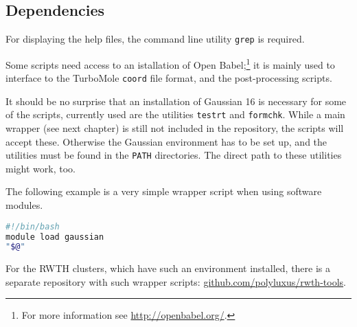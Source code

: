 \documentclass[   %
  final,          %
  a4paper         %
]{article}
\begin{document}
\subsection{Dependencies}

For displaying the help files, the command line utility \texttt{grep} is required.

Some scripts need access to an istallation of Open Babel;\footnote{%
  For more information see \href{http://openbabel.org/}{http://openbabel.org/}.}
it is mainly used to interface to the TurboMole \texttt{coord} file format,
and the post-processing scripts.

It should be no surprise that an installation of Gaussian 16 is necessary for
some of the scripts, currently used are the utilities \texttt{testrt} and \texttt{formchk}.
While a main wrapper (see next chapter) is still not included in the repository,
the scripts will accept these.
Otherwise the Gaussian environment has to be set up, 
and the utilities must be found in the \texttt{PATH} directories.
The direct path to these utilities might work, too.

The following example is a very simple wrapper script when using software modules. 
\begin{lstlisting}[language=bash]
#!/bin/bash
module load gaussian
"$@"
\end{lstlisting}
For the RWTH clusters, which have such an environment installed, 
there is a separate repository with such wrapper scripts:
\href{https://github.com/polyluxus/rwth-tools}{github.com/polyluxus/rwth-tools}.
\end{document}
